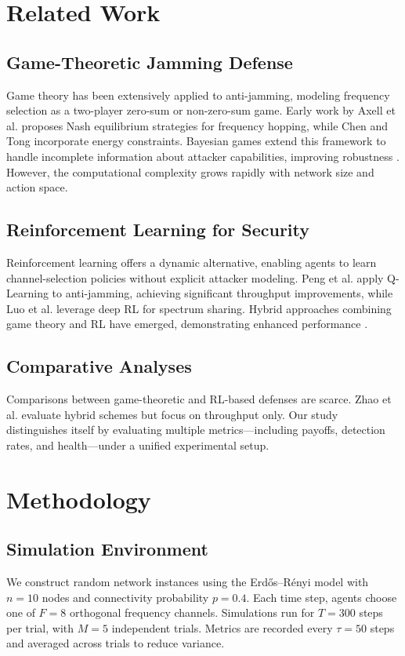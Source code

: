 \documentclass[conference]{IEEEtran}
\begin{document}
\section{Related Work}
\subsection{Game-Theoretic Jamming Defense}
Game theory has been extensively applied to anti-jamming, modeling frequency selection as a two-player zero-sum or non-zero-sum game. Early work by Axell et al. \cite{axell2012detection} proposes Nash equilibrium strategies for frequency hopping, while Chen and Tong \cite{chen2019anti} incorporate energy constraints. Bayesian games extend this framework to handle incomplete information about attacker capabilities, improving robustness \cite{alpcan2007game,khouzani2012evolving}. However, the computational complexity grows rapidly with network size and action space.

\subsection{Reinforcement Learning for Security}
Reinforcement learning offers a dynamic alternative, enabling agents to learn channel-selection policies without explicit attacker modeling. Peng et al. \cite{peng2017anti} apply Q-Learning to anti-jamming, achieving significant throughput improvements, while Luo et al. \cite{luo2018anti} leverage deep RL for spectrum sharing. Hybrid approaches combining game theory and RL have emerged, demonstrating enhanced performance \cite{zhao2020hybrid,li2021game}.

\subsection{Comparative Analyses}
Comparisons between game-theoretic and RL-based defenses are scarce. Zhao et al. \cite{zhao2020hybrid} evaluate hybrid schemes but focus on throughput only. Our study distinguishes itself by evaluating multiple metrics—including payoffs, detection rates, and health—under a unified experimental setup.

\section{Methodology}
\subsection{Simulation Environment}
We construct random network instances using the Erd\H{o}s–R\'enyi model with $n=10$ nodes and connectivity probability $p=0.4$. Each time step, agents choose one of $F=8$ orthogonal frequency channels. Simulations run for $T=300$ steps per trial, with $M=5$ independent trials. Metrics are recorded every $\tau=50$ steps and averaged across trials to reduce variance.
\end{document}
